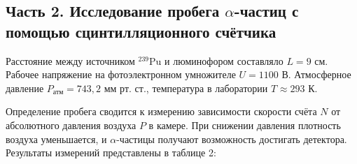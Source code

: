 \documentclass[12pt, a4paper]{article}
\begin{document}







\subsection*{Часть 2. Исследование пробега $\alpha$-частиц с помощью сцинтилляционного счётчика}

Расстояние между источником $^{239}\text{Pu}$ и люминофором составляло $L = 9$ см. Рабочее напряжение на фотоэлектронном умножителе $U = 1100$ В. Атмосферное давление $P_{\text{атм}} = 743,2$ мм рт. ст., температура в лаборатории $T_{\text{}} \approx 293$ К. 

Определение пробега сводится к измерению зависимости скорости счёта $N$ от абсолютного давления воздуха $P$ в камере. При снижении давления плотность воздуха уменьшается, и $\alpha$-частицы получают возможность достигать детектора. Результаты измерений представлены в таблице 2:
\end{document}
